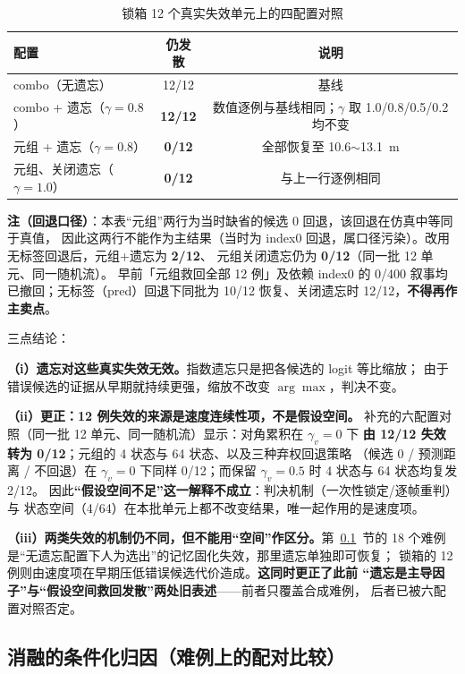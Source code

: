 \documentclass[UTF8,a4paper,zihao=-4]{ctexart}
\begin{document}
\begin{table}[htbp]\centering\small
\caption{锁箱 12 个真实失效单元上的四配置对照}\label{tab:attr-forget}
\begin{tabular}{@{}lcc@{}}\toprule
配置 & 仍发散 & 说明 \\ \midrule
combo（无遗忘） & 12/12 & 基线 \\
combo + 遗忘（$\gamma=0.8$） & \textbf{12/12} & 数值逐例与基线相同；$\gamma$ 取 1.0/0.8/0.5/0.2 均不变 \\
元组 + 遗忘（$\gamma=0.8$） & \textbf{0/12} & 全部恢复至 10.6$\sim$13.1~m \\
元组、关闭遗忘（$\gamma=1.0$） & \textbf{0/12} & 与上一行逐例相同 \\ \bottomrule
\end{tabular}\end{table}

\textbf{注（回退口径）}：本表“元组”两行为当时缺省的候选 0 回退，该回退在仿真中等同于真值，
因此这两行不能作为主结果（当时为 index0 回退，属口径污染）。改用无标签回退后，元组+遗忘为 \textbf{2/12}、
元组关闭遗忘仍为 \textbf{0/12}（同一批 12 单元、同一随机流）。
早前「元组救回全部 12 例」及依赖 index0 的 0/400 叙事均已撤回；无标签（pred）回退下同批为 10/12 恢复、关闭遗忘时 12/12，\textbf{不得再作主卖点}。

三点结论：

\textbf{（i）遗忘对这些真实失效无效。}指数遗忘只是把各候选的 logit 等比缩放；
由于错误候选的证据从早期就持续更强，缩放不改变 $\arg\max$，判决不变。

\textbf{（ii）更正：12 例失效的来源是速度连续性项，不是假设空间。}
补充的六配置对照（同一批 12 单元、同一随机流）显示：对角累积在 $\gamma_v=0$ 下
\textbf{由 12/12 失效转为 0/12}；元组的 4 状态与 64 状态、以及三种弃权回退策略
（候选 0 / 预测距离 / 不回退）在 $\gamma_v=0$ 下同样 0/12；而保留 $\gamma_v=0.5$ 时
4 状态与 64 状态均复发 2/12。
因此\textbf{“假设空间不足”这一解释不成立}：判决机制（一次性锁定/逐帧重判）与
状态空间（4/64）在本批单元上都不改变结果，唯一起作用的是速度项。

\textbf{（iii）两类失效的机制仍不同，但不能用“空间”作区分。}第~\ref{sup:abl-hard}~节的
18 个难例是“无遗忘配置下人为选出”的记忆固化失效，那里遗忘单独即可恢复；
锁箱的 12 例则由速度项在早期压低错误候选代价造成。\textbf{这同时更正了此前
“遗忘是主导因子”与“假设空间救回发散”两处旧表述}——前者只覆盖合成难例，
后者已被六配置对照否定。

\subsection{消融的条件化归因（难例上的配对比较）}\label{sup:abl-hard}
\end{document}
